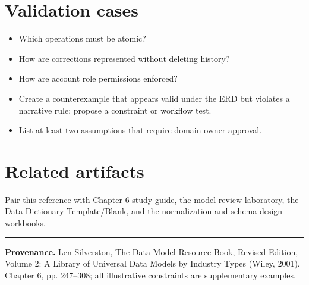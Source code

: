 \documentclass[11pt,letterpaper]{article}
\begin{document}
\section{Validation cases}
\begin{itemize}
\item Which operations must be atomic?
\item How are corrections represented without deleting history?
\item How are account role permissions enforced?
\item Create a counterexample that appears valid under the ERD but violates a narrative rule; propose a constraint or workflow test.
\item List at least two assumptions that require domain-owner approval.
\end{itemize}

\section{Related artifacts}
Pair this reference with Chapter 6 study guide, the model-review laboratory, the Data Dictionary Template/Blank, and the normalization and schema-design workbooks.


\vfill
\hrule
{\footnotesize\textbf{Provenance.} Len Silverston, The Data Model Resource Book, Revised Edition, Volume 2: A Library of Universal Data Models by Industry Types (Wiley, 2001). Chapter 6, pp. 247--308; all illustrative constraints are supplementary examples.}
\end{document}
